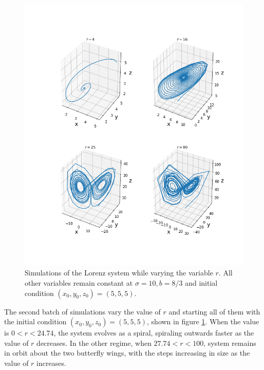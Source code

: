 \documentclass[twocolumn]{article}
\begin{document}
\begin{figure}
	\includegraphics[width=\linewidth]{sims2.png}
	\caption{
		Simulations of the Lorenz system while varying the variable $r$. All other
		variables remain constant at $\sigma=10, b=8/3$ and initial condition $(x_0,
		y_0, z_0) = (5, 5, 5)$.
	}
	\label{fig:sims_vary_r}
\end{figure}

The second batch of simulations vary the value of $r$ and starting all of them
with the initial condition $(x_0, y_0, z_0) = (5, 5, 5)$, shown in figure
\ref{fig:sims_vary_r}. When the value is $0 < r < 24.74$, the system evolves as
a spiral, spiraling outwards faster as the value of $r$ decreases. In the other
regime, when $27.74 < r < 100$, system remains in orbit about the two butterfly
wings, with the steps increasing in size as the value of $r$ increases.
\end{document}
